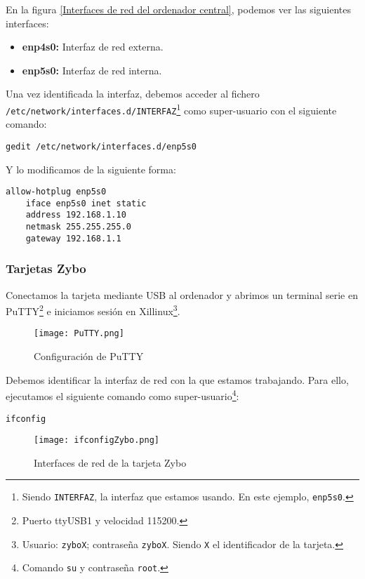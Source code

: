 \documentclass[12pt,letterpaper]{article}
\begin{document}
En la figura \ref{Interfaces de red del ordenador central}, podemos ver las siguientes interfaces:
\begin{itemize}
	\item \textbf{enp4s0:} Interfaz de red externa.
	\item \textbf{enp5s0:} Interfaz de red interna.
\end{itemize}

Una vez identificada la interfaz, debemos acceder al fichero\\ \texttt{/etc/network/interfaces.d/INTERFAZ}\footnote{Siendo \texttt{INTERFAZ}, la interfaz que estamos usando. En este ejemplo, \texttt{enp5s0}.} como super-usuario con el siguiente comando:
\begin{center}
	\texttt{gedit /etc/network/interfaces.d/enp5s0}
\end{center}
Y lo modificamos de la siguiente forma:
\begin{lstlisting}
allow-hotplug enp5s0
    iface enp5s0 inet static
    address 192.168.1.10
    netmask 255.255.255.0
    gateway 192.168.1.1
\end{lstlisting}

\newpage

\subsubsection{Tarjetas Zybo}
Conectamos la tarjeta mediante USB al ordenador y abrimos un terminal serie en PuTTY\footnote{Puerto ttyUSB1 y velocidad 115200.} e iniciamos sesión en Xillinux\footnote{Usuario: \texttt{zyboX}; contraseña \texttt{zyboX}. Siendo \texttt{X} el identificador de la tarjeta.}.

\begin{figure}[h]
	\centering
	\texttt{[image: PuTTY.png]}
	\caption{Configuración de PuTTY}
	\label{Configuración de PuTTY}
\end{figure}

Debemos identificar la interfaz de red con la que estamos trabajando. Para ello, ejecutamos el siguiente comando como super-usuario\footnote{Comando \texttt{su} y contraseña \texttt{root}.}:
\begin{center}
	\texttt{ifconfig}
\end{center}
\newpage
\begin{figure}[h]
	\centering
	\texttt{[image: ifconfigZybo.png]}
	\caption{Interfaces de red de la tarjeta Zybo}
	\label{Interfaces de red de la tarjeta Zybo}
\end{figure}
\end{document}
